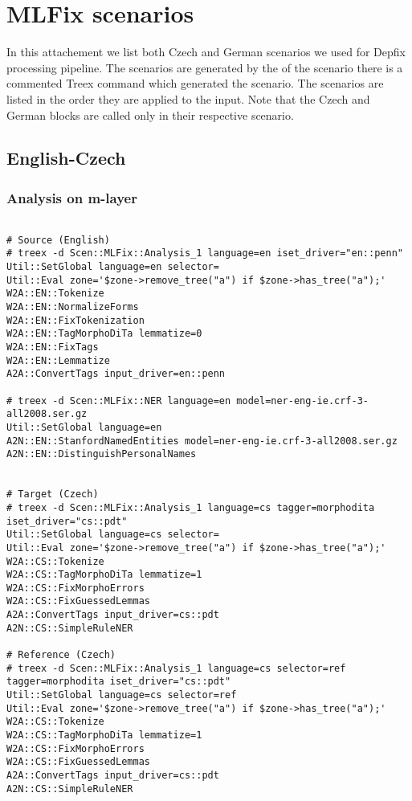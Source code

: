 \chapter{MLFix scenarios}
\label{chap:scenario}

In this attachement we list both Czech and German scenarios we used for Depfix processing
pipeline. The scenarios are generated by the %
of the scenario there is a commented Treex command which generated the scenario. The scenarios
are listed in the order they are applied to the input. Note that the Czech and German blocks
are called only in their respective scenario.

\section{English-Czech}

\subsection{Analysis on m-layer}

\lstset{basicstyle=\ttfamily,breaklines=true}
\begin{lstlisting}

# Source (English)
# treex -d Scen::MLFix::Analysis_1 language=en iset_driver="en::penn"
Util::SetGlobal language=en selector=
Util::Eval zone='$zone->remove_tree("a") if $zone->has_tree("a");'
W2A::EN::Tokenize
W2A::EN::NormalizeForms
W2A::EN::FixTokenization
W2A::EN::TagMorphoDiTa lemmatize=0
W2A::EN::FixTags
W2A::EN::Lemmatize
A2A::ConvertTags input_driver=en::penn

# treex -d Scen::MLFix::NER language=en model=ner-eng-ie.crf-3-all2008.ser.gz
Util::SetGlobal language=en
A2N::EN::StanfordNamedEntities model=ner-eng-ie.crf-3-all2008.ser.gz
A2N::EN::DistinguishPersonalNames


# Target (Czech)
# treex -d Scen::MLFix::Analysis_1 language=cs tagger=morphodita iset_driver="cs::pdt"
Util::SetGlobal language=cs selector=
Util::Eval zone='$zone->remove_tree("a") if $zone->has_tree("a");'
W2A::CS::Tokenize
W2A::CS::TagMorphoDiTa lemmatize=1
W2A::CS::FixMorphoErrors
W2A::CS::FixGuessedLemmas
A2A::ConvertTags input_driver=cs::pdt
A2N::CS::SimpleRuleNER

# Reference (Czech)
# treex -d Scen::MLFix::Analysis_1 language=cs selector=ref tagger=morphodita iset_driver="cs::pdt"
Util::SetGlobal language=cs selector=ref
Util::Eval zone='$zone->remove_tree("a") if $zone->has_tree("a");'
W2A::CS::Tokenize
W2A::CS::TagMorphoDiTa lemmatize=1
W2A::CS::FixMorphoErrors
W2A::CS::FixGuessedLemmas
A2A::ConvertTags input_driver=cs::pdt
A2N::CS::SimpleRuleNER

\end{lstlisting}

